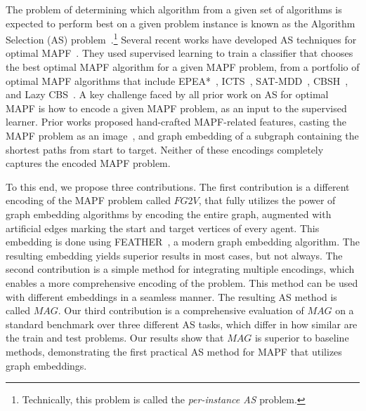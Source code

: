 \documentclass{ecai}
\newcommand{\Carmel}[1]{\textcolor{red}{\textsc{Carmel}: #1}}
\newcommand{\Roni}[1]{}
\newcommand{\fgtv}[1]{\ensuremath{\textit{FG2V}}\xspace}
\newcommand{\mapfgas}[1]{\ensuremath{\textit{MAG}}\xspace}
\begin{document}
The problem of determining which algorithm from a given set of algorithms is expected to perform best on a given problem instance is known as the 
Algorithm Selection (AS) problem~\cite{rice1976algorithm,kerschke2019automated}.\footnote{Technically, this problem is called the \emph{per-instance AS} problem.}
Several recent works have developed AS techniques for optimal MAPF~\cite{kaduri2020algorithm,ren2021mapfast,alkazzi2022mapfaster}. 
They used supervised learning to
train a classifier that chooses the best optimal MAPF algorithm for a given MAPF problem, from a portfolio of optimal MAPF algorithms that include EPEA*~\cite{goldenberg2014enhanced}, ICTS~\cite{sharon2013increasing}, SAT-MDD~\cite{surynek2016efficient}, CBSH~\cite{felner2018adding}, and Lazy CBS~\cite{gange2019lazy}.  
A key challenge faced by all prior work on AS for optimal MAPF is how to encode a given MAPF problem, as an input to the supervised learner. Prior works proposed hand-crafted MAPF-related features, casting the MAPF problem as an image~\cite{alkazzi2022mapfaster}, and graph embedding of a subgraph containing the shortest paths from start to target. Neither of these encodings completely captures the encoded MAPF problem.



To this end, we propose three contributions.
The first contribution is a different encoding of the MAPF problem called \fgtv\ , that fully utilizes the power of graph embedding algorithms by encoding the entire graph, augmented with artificial edges marking the start and target vertices of every agent. 
This embedding is done using FEATHER~\cite{rozemberczki2020characteristic}, a modern graph embedding algorithm. %
The resulting embedding yields superior results in most cases, but not always. 
The second contribution is a simple method for integrating multiple encodings, which enables a more comprehensive encoding of the problem. This method can be used with different embeddings in a seamless manner. The resulting AS method is called \mapfgas\ . 
Our third contribution is a comprehensive evaluation of \mapfgas\ on a standard benchmark over three different AS tasks, which differ in how similar are the train and test problems. Our results show that \mapfgas\ is superior to baseline methods, demonstrating the first practical AS method for MAPF that utilizes graph embeddings. 
\end{document}
